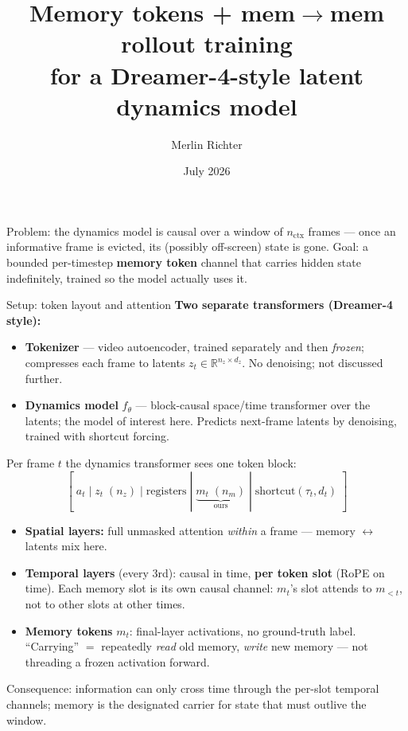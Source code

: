 \documentclass[10pt,aspectratio=169]{beamer}
\title{Memory tokens + mem$\to$mem rollout training\\{\large for a Dreamer-4-style latent dynamics model}}
\author{Merlin Richter}
\date{July 2026}
\newcommand{\mem}{m}
\begin{document}
\begin{frame}
  \titlepage
  \begin{center}\small
  Problem: the dynamics model is causal over a window of $n_{\text{ctx}}$ frames --- once an informative frame is
  evicted, its (possibly off-screen) state is gone. Goal: a bounded per-timestep \textbf{memory token}
  channel that carries hidden state indefinitely, trained so the model actually uses it.
  \end{center}
\end{frame}

\begin{frame}{Setup: token layout and attention}
\textbf{Two separate transformers (Dreamer-4 style):}
\begin{itemize}
  \item \textbf{Tokenizer} --- video autoencoder, trained separately and then \emph{frozen}; compresses each
        frame to latents $z_t \in \mathbb{R}^{n_z \times d_z}$. No denoising; not discussed further.
  \item \textbf{Dynamics model} $f_\theta$ --- block-causal space/time transformer over the latents; the model
        of interest here. Predicts next-frame latents by denoising, trained with shortcut forcing.
\end{itemize}
Per frame $t$ the dynamics transformer sees one token block:
\[
[\; a_t \;|\; z_t \;(n_z) \;|\; \text{registers} \;|\; \underbrace{\mem_t \;(n_m)}_{\text{ours}} \;|\; \text{shortcut}(\tau_t, d_t) \;]
\]
\begin{itemize}
  \item \textbf{Spatial layers:} full unmasked attention \emph{within} a frame --- memory $\leftrightarrow$ latents mix here.
  \item \textbf{Temporal layers} (every 3rd): causal in time, \textbf{per token slot} (RoPE on time). Each memory
        slot is its own causal channel: $\mem_t$'s slot attends to $\mem_{<t}$, not to other slots at other times.
  \item \textbf{Memory tokens} $\mem_t$: final-layer activations, no ground-truth label. ``Carrying'' $=$ repeatedly
        \emph{read} old memory, \emph{write} new memory --- not threading a frozen activation forward.
\end{itemize}
\medskip
Consequence: information can only cross time through the per-slot temporal channels; memory is the
designated carrier for state that must outlive the window.
\end{frame}
\end{document}
